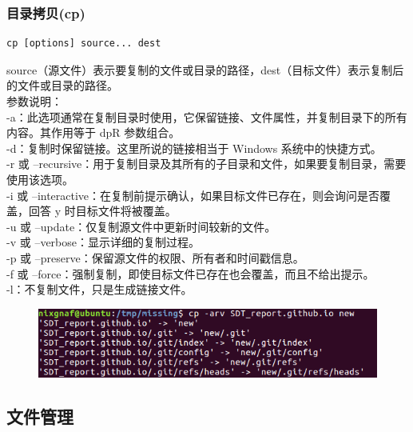 \documentclass{article}
\begin{document}
\subsubsection{目录拷贝(cp)}
\begin{lstlisting}[style=myStyle]
cp [options] source... dest
\end{lstlisting}
source（源文件）表示要复制的文件或目录的路径，dest（目标文件）表示复制后的文件或目录的路径。\\
参数说明：\\
-a：此选项通常在复制目录时使用，它保留链接、文件属性，并复制目录下的所有内容。其作用等于 dpR 参数组合。\\
-d：复制时保留链接。这里所说的链接相当于 Windows 系统中的快捷方式。\\
-r 或 --recursive：用于复制目录及其所有的子目录和文件，如果要复制目录，需要使用该选项。\\
-i 或 --interactive：在复制前提示确认，如果目标文件已存在，则会询问是否覆盖，回答 y 时目标文件将被覆盖。\\
-u 或 --update：仅复制源文件中更新时间较新的文件。\\
-v 或 --verbose：显示详细的复制过程。\\
-p 或 --preserve：保留源文件的权限、所有者和时间戳信息。\\
-f 或 --force：强制复制，即使目标文件已存在也会覆盖，而且不给出提示。\\
-l：不复制文件，只是生成链接文件。
\begin{figure}[h]
    \centering
    \includegraphics[width=0.5\linewidth]{image14.png}
\end{figure}
\subsection{文件管理}
\end{document}
